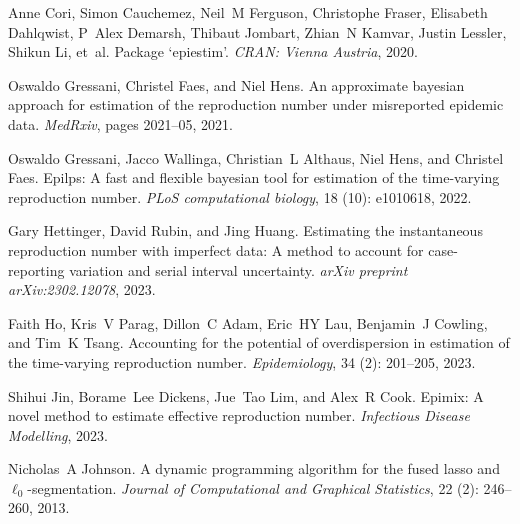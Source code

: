 \documentclass[10pt,letterpaper]{article}
\begin{document}
\begin{thebibliography}{27}
  Anne Cori, Simon Cauchemez, Neil~M Ferguson, Christophe Fraser, Elisabeth
    Dahlqwist, P~Alex Demarsh, Thibaut Jombart, Zhian~N Kamvar, Justin Lessler,
    Shikun Li, et~al.
  \newblock Package `epiestim'.
  \newblock \emph{CRAN: Vienna Austria}, 2020.
  
  Oswaldo Gressani, Christel Faes, and Niel Hens.
  \newblock An approximate bayesian approach for estimation of the reproduction
    number under misreported epidemic data.
  \newblock \emph{MedRxiv}, pages 2021--05, 2021.
  
  Oswaldo Gressani, Jacco Wallinga, Christian~L Althaus, Niel Hens, and Christel
    Faes.
  \newblock Epilps: A fast and flexible bayesian tool for estimation of the
    time-varying reproduction number.
  \newblock \emph{PLoS computational biology}, 18 (10):
    e1010618, 2022.
  
  Gary Hettinger, David Rubin, and Jing Huang.
  \newblock Estimating the instantaneous reproduction number with imperfect data:
    A method to account for case-reporting variation and serial interval
    uncertainty.
  \newblock \emph{arXiv preprint arXiv:2302.12078}, 2023.
  
  Faith Ho, Kris~V Parag, Dillon~C Adam, Eric~HY Lau, Benjamin~J Cowling, and
    Tim~K Tsang.
  \newblock Accounting for the potential of overdispersion in estimation of the
    time-varying reproduction number.
  \newblock \emph{Epidemiology}, 34 (2): 201--205, 2023.
  
  Shihui Jin, Borame~Lee Dickens, Jue~Tao Lim, and Alex~R Cook.
  \newblock Epimix: A novel method to estimate effective reproduction number.
  \newblock \emph{Infectious Disease Modelling}, 2023.
  
  Nicholas~A Johnson.
  \newblock A dynamic programming algorithm for the fused lasso and
    $\ell_0$-segmentation.
  \newblock \emph{Journal of Computational and Graphical Statistics}, 22
    (2): 246--260, 2013.
  

\end{thebibliography}
\end{document}

